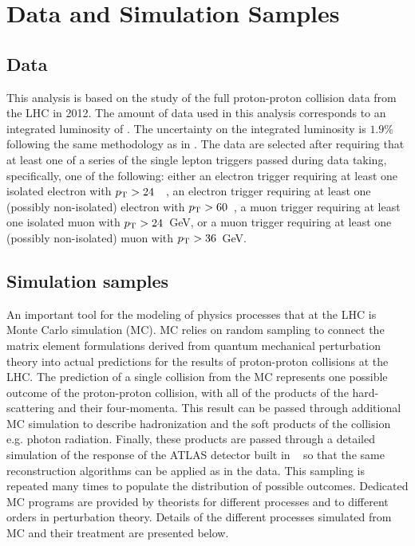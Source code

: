 \section{Data and Simulation Samples}
\subsection{Data}
\label{sec:subsection_data}



This analysis is based on the study of the full proton-proton collision
data from the LHC in 2012. The amount 
of data used in this analysis corresponds to 
an integrated luminosity of \lumi.
The uncertainty on the integrated luminosity is $1.9\%$ 
following the same methodology as in \cite{Aad:2013ucp}.
The data are selected after requiring that at least one
of a series of the single lepton triggers passed during data taking, 
specifically, one of the following:
either an electron trigger 
requiring at least one isolated
electron with $p_{\mathrm{T}}>24$~\GeV~, an electron trigger requiring
at least one (possibly non-isolated) electron 
with $p_{\mathrm{T}}>60$~\GeV, a muon 
trigger requiring at least one isolated muon with $p_{\mathrm{T}}>24$~GeV,
or a muon trigger requiring at least one 
(possibly non-isolated) muon with $p_{\mathrm{T}}>36$~GeV.


\subsection{Simulation samples}

An important tool for the modeling of physics processes
that at the LHC is Monte Carlo simulation (MC).
MC relies on random sampling to connect the matrix element formulations
derived from quantum mechanical perturbation theory into 
actual predictions for the results of proton-proton collisions
at the LHC.
The prediction of a single collision from the MC represents
one possible outcome of the proton-proton collision, with all of the 
products of the hard-scattering and their four-momenta.
This result can be passed through additional MC simulation to describe
hadronization and the soft products of the collision e.g. photon radiation.
Finally, these products are passed through a detailed 
simulation of the response of the 
ATLAS detector built in \geant~\cite{Agostinelli:2002hh}
so that the same reconstruction algorithms
can be applied as in the data.
This sampling is repeated many times to populate the 
distribution of possible
outcomes. Dedicated MC programs are provided by theorists for 
different processes and to different orders in perturbation theory.
Details of the different processes simulated from MC and their
treatment are presented below.





\newpage




